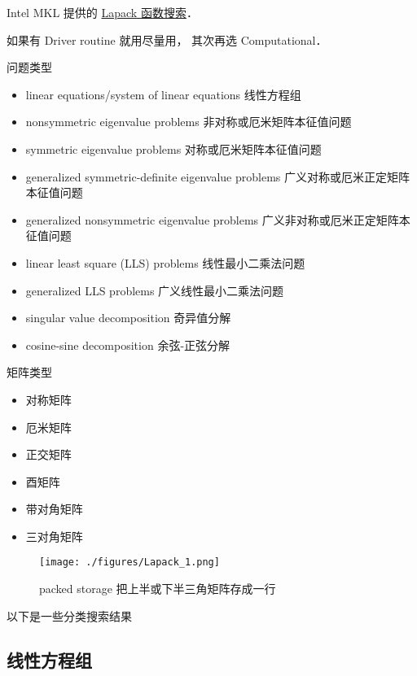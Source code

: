 
\begin{issues}
\issueDraft
\end{issues}


Intel MKL 提供的 \href{https://www.intel.com/content/www/us/en/developer/tools/oneapi/onemkl-function-finding-advisor.html}{Lapack 函数搜索}．

如果有 Driver routine 就用尽量用， 其次再选 Computational．

问题类型
\begin{itemize}
\item linear equations/system of linear equations 线性方程组
\item nonsymmetric eigenvalue problems 非对称或厄米矩阵本征值问题
\item symmetric eigenvalue problems 对称或厄米矩阵本征值问题
\item generalized symmetric-definite eigenvalue problems 广义对称或厄米正定矩阵本征值问题
\item generalized nonsymmetric eigenvalue problems 广义非对称或厄米正定矩阵本征值问题
\item linear least square (LLS) problems 线性最小二乘法问题
\item generalized LLS problems 广义线性最小二乘法问题
\item singular value decomposition 奇异值分解
\item cosine-sine decomposition 余弦-正弦分解
\end{itemize}

矩阵类型
\begin{itemize}
\item 对称矩阵
\item 厄米矩阵
\item 正交矩阵
\item 酉矩阵
\item 带对角矩阵
\item 三对角矩阵
\end{itemize}

\begin{figure}[ht]
\centering
\texttt{[image: ./figures/Lapack\_1.png]}
\caption{packed storage 把上半或下半三角矩阵存成一行} \label{Lapack_fig1}
\end{figure}

以下是一些分类搜索结果

\subsection{线性方程组}
